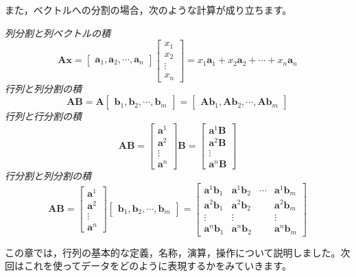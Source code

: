 \documentclass{ltjsbook}
\begin{document}
また，ベクトルへの分割の場合，次のような計算が成り立ちます。

\textit{列分割と列ベクトルの積}
\[
	\bm{Ax} = \begin{bmatrix} \bm{a}_1,\bm{a}_2, \cdots,\bm{a}_n \end{bmatrix}\begin{bmatrix} x_1 \\x_2 \\ \vdots \\ x_n \end{bmatrix} = x_1\bm{a}_1 + x_2\bm{a}_2 +\cdots+ x_n\bm{a}_n
\]
\textit{行列と列分割の積}
\[
	\bm{AB} = \bm{A}\begin{bmatrix} \bm{b}_1,\bm{b}_2,\cdots,\bm{b}_m \end{bmatrix} = \begin{bmatrix}\bm{Ab}_1,\bm{Ab}_2,\cdots,\bm{Ab}_m\end{bmatrix}
\]
\textit{行列と行分割の積}
\[
	\bm{AB} = \begin{bmatrix} \bm{a}^1\\ \bm{a}^2 \\ \vdots \\ \bm{a}^n \end{bmatrix}\bm{B} = \begin{bmatrix}\bm{a}^1\bm{B} \\\bm{a}^2\bm{B} \\ \vdots \\\bm{a}^n\bm{B} \end{bmatrix}
\]
\textit{行分割と列分割の積}
\[
	\bm{AB} = \begin{bmatrix} \bm{a}^1\\ \bm{a}^2 \\ \vdots \\ \bm{a}^n \end{bmatrix}\begin{bmatrix}\bm{b}_1,\bm{b}_2,\cdots,\bm{b}_m\end{bmatrix} =
	\begin{bmatrix} \bm{a}^1\bm{b}_1 & \bm{a}^1\bm{b}_2 & \cdots & \bm{a}^1\bm{b}_m \\
                \bm{a}^2\bm{b}_1 & \bm{a}^2\bm{b}_2 &        & \bm{a}^2\bm{b}_m \\
                \vdots           & \vdots           &        & \vdots           \\
                \bm{a}^n\bm{b}_1 & \bm{a}^n\bm{b}_2 &        & \bm{a}^n\bm{b}_m
	\end{bmatrix}
\]

この章では，行列の基本的な定義，名称，演算，操作について説明しました。次回はこれを使ってデータをどのように表現するかをみていきます。
\end{document}

